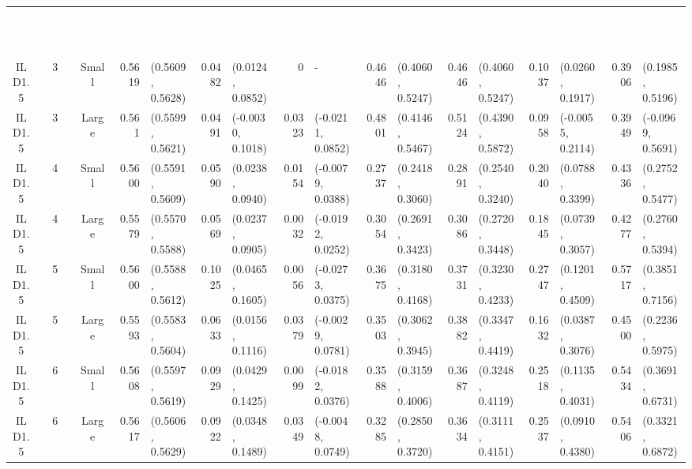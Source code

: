 \begin{landscape}
\begin{table}
\begin{tabular}{cccrlrlrlrlrlrlrl}
                \textcolor{white}{Trait}	&	\textcolor{white}{Generation}	&	\textcolor{white}{Treatment}	&	\textcolor{white}{Estimate}	&	\multicolumn{1}{c}{\textcolor{white}{CI}}	&	
                \textcolor{white}{Estimate}	&	\multicolumn{1}{c}{\textcolor{white}{CI}}	&	\textcolor{white}{Estimate}	&	\multicolumn{1}{c}{\textcolor{white}{CI}}	&	
                \textcolor{white}{Estimate}	&	\multicolumn{1}{c}{\textcolor{white}{CI}}	&	\textcolor{white}{Estimate}	&	\multicolumn{1}{c}{\textcolor{white}{CI}}	&	
                \textcolor{white}{Estimate}	&	\multicolumn{1}{c}{\textcolor{white}{CI}}	&	\textcolor{white}{Estimate}	&	\multicolumn{1}{c}{\textcolor{white}{CI}}	\\
ILD1.5	&	3	&	Small	&	0.5619	&	(0.5609, 0.5628)	&	0.0482	&	(0.0124, 0.0852)	&	0	&	-	&	0.4646	&	(0.4060, 0.5247)	&	0.4646	&	(0.4060, 0.5247)	&	0.1037	&	(0.0260, 0.1917)	&	0.3906	&	(0.1985, 0.5196)	\\
ILD1.5	&	3	&	Large	&	0.561	&	(0.5599, 0.5621)	&	0.0491	&	(-0.0030, 0.1018)	&	0.0323	&	(-0.0211, 0.0852)	&	0.4801	&	(0.4146, 0.5467)	&	0.5124	&	(0.4390, 0.5872)	&	0.0958	&	(-0.0055, 0.2114)	&	0.3949	&	(-0.0969, 0.5691)	\\
ILD1.5	&	4	&	Small	&	0.5600	&	(0.5591, 0.5609)	&	0.0590	&	(0.0238, 0.0940)	&	0.0154	&	(-0.0079, 0.0388)	&	0.2737	&	(0.2418, 0.3060)	&	0.2891	&	(0.2540, 0.3240)	&	0.2040	&	(0.0788, 0.3399)	&	0.4336	&	(0.2752, 0.5477)	\\
ILD1.5	&	4	&	Large	&	0.5579	&	(0.5570, 0.5588)	&	0.0569	&	(0.0237, 0.0905)	&	0.0032	&	(-0.0192, 0.0252)	&	0.3054	&	(0.2691, 0.3423)	&	0.3086	&	(0.2720, 0.3448)	&	0.1845	&	(0.0739, 0.3057)	&	0.4277	&	(0.2760, 0.5394)	\\
ILD1.5	&	5	&	Small	&	0.5600	&	(0.5588, 0.5612)	&	0.1025	&	(0.0465, 0.1605)	&	0.0056	&	(-0.0273, 0.0375)	&	0.3675	&	(0.3180, 0.4168)	&	0.3731	&	(0.3230, 0.4233)	&	0.2747	&	(0.1201, 0.4509)	&	0.5717	&	(0.3851, 0.7156)	\\
ILD1.5	&	5	&	Large	&	0.5593	&	(0.5583, 0.5604)	&	0.0633	&	(0.0156, 0.1116)	&	0.0379	&	(-0.0029, 0.0781)	&	0.3503	&	(0.3062, 0.3945)	&	0.3882	&	(0.3347, 0.4419)	&	0.1632	&	(0.0387, 0.3076)	&	0.4500	&	(0.2236, 0.5975)	\\
ILD1.5	&	6	&	Small	&	0.5608	&	(0.5597, 0.5619)	&	0.0929	&	(0.0429, 0.1425)	&	0.0099	&	(-0.0182, 0.0376)	&	0.3588	&	(0.3159, 0.4006)	&	0.3687	&	(0.3248, 0.4119)	&	0.2518	&	(0.1135, 0.4031)	&	0.5434	&	(0.3691, 0.6731)	\\
ILD1.5	&	6	&	Large	&	0.5617	&	(0.5606, 0.5629)	&	0.0922	&	(0.0348, 0.1489)	&	0.0349	&	(-0.0048, 0.0749)	&	0.3285	&	(0.2850, 0.3720)	&	0.3634	&	(0.3111, 0.4151)	&	0.2537	&	(0.0910, 0.4380)	&	0.5406	&	(0.3321, 0.6872)	\\

\end{tabular}
\end{table}
\end{landscape}
